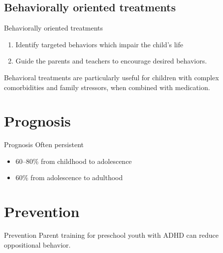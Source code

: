 \documentclass{beamer}
\begin{document}
\subsection{Behaviorally oriented treatments}
\begin{frame}{Behaviorally oriented treatments}
\begin{enumerate}
    \item Identify targeted behaviors which impair the child's life
    \item Guide the parents and teachers to encourage desired behaviors.
\end{enumerate}

Behavioral treatments are particularly useful for children with complex
comorbidities and family stressors, when combined with medication.
\end{frame}

\section{Prognosis}
\begin{frame}{Prognosis}
Often persistent

\begin{itemize}
    \item 60--80\% from childhood to adolescence
    \item 60\% from adolescence to adulthood
\end{itemize}
\end{frame}

\section{Prevention}
\begin{frame}{Prevention}
Parent training for preschool youth with ADHD can reduce oppositional behavior.
\end{frame}
\end{document}
